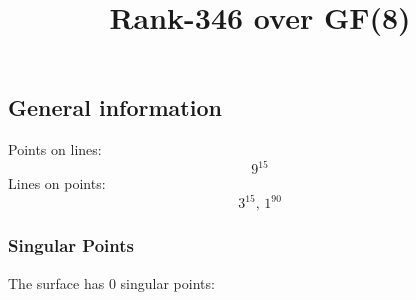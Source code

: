 \documentclass{article}
\newcommand\setTBstruts{\def\T{\rule{0pt}{2.6ex}}%
\def\B{\rule[-1.2ex]{0pt}{0pt}}}
\begin{document}
 
\setTBstruts



{\allowdisplaybreaks%






\title{Rank-346 over GF(8)}
\author{}%
\maketitle%
%
{}



\subsection*{General information}
Points on lines:
$$
9^{15}$$
Lines on points:
$$
3^{15},\,1^{90}$$
\subsubsection*{Singular Points}
The surface has 0 singular points:\\
\begin{align*}
\end{align*}
}
\end{document}
